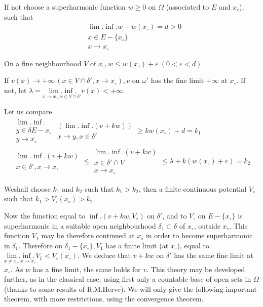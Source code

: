 If not choose a superharmonic function $w \ge 0$ on $\Omega$
(associated to $E$ and $x_\circ$), such that 
\begin{align*}
  & \lim. \inf. w - w(x_\circ) = d > 0\\
  & x \in E - \{x_\circ\}\\
  & x \to x_\circ
\end{align*}

On a fine neighbourhood $V$ of $x_\circ,  w \le w(x_\circ) + \varepsilon ~(0 <
\varepsilon < d)$. 

If $v(x) \to + \infty \, (x \in V \cap \delta',  x \to x_\circ ), v$
on $\omega'$ has the fine limit $+ \infty$ at $x_\circ$. If not, let
$\lambda = \underset{x \to x_\circ, x \in V \cap \delta'}{\lim. \inf. } v
(x) < + \infty$.  

Let us compare
\begin{gather*}
   {\substack{\lim. \inf.\\y \in \delta E - x_\circ\\y \to x_\circ}}
  {\substack{(\lim. \inf. (v + kw))\\x \to y, x \in \delta'}} \ge
  kw(x_\circ) + d = k_1\\  
  \substack{\lim. \inf. (v + kw)\\x \in \delta',  x \to x_\circ}  \le
\substack{\lim. \inf.(v + kw)\\ x \in \delta' \cap V \\ x \to x_\circ}  \le
\lambda + k(w (x_\circ) + \varepsilon) = k_2 
\end{gather*}

We\pageoriginale shall choose $k_1$ and $k_2$ such that $k_1 > k_2$, then a finite continuous
potential $V_\circ$ such that $k_1 > V_\circ (x_\circ) > k_2$. 

Now the function equal to $\inf. (v + kw, V_\circ)$ on $\delta'$, and to
$V_\circ$ on $E - \{x_\circ\}$ is superharmonic in a suitable open
neighbourhood $\delta_1 \subset \delta$ of $x_\circ$, outside $x_\circ$. This
function $V_1$ may be therefore continued at $x_\circ$ in order to become
superharmonic in $\delta_1$. Therefore on $\delta_1 - \{x_\circ\}, V_1$
has a finite limit (at $x_\circ$), equal to $\underset{x \neq x_\circ, x \to
  x_\circ}{\lim. \inf.} V_1 < V_\circ (x_\circ)$. We deduce that $v + kw $ on
$\delta'$ has the same fine limit at $x_\circ$. As $w$ has a fine limit,
the same holds for $v$. This theory may be developed further, as in
the classical case, using first only a countable base of open sets in
$\Omega$ (thanks to some results of R.M.Herve). We will only  give the
following important theorem, with more restrictions, using the
convergence theorem. 


